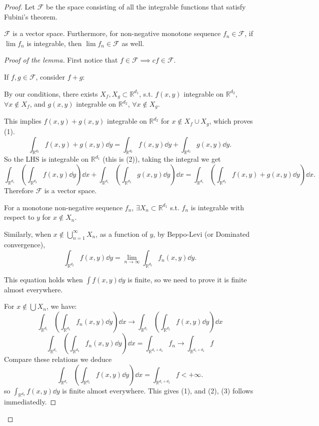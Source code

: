 \begin{proof}[Proof]
    Let $\mathscr{F}$ be the space consisting of all the integrable functions that
	satisfy Fubini's theorem.

	\begin{lemma}
		$\mathscr{F}$ is a vector space. Furthermore, for non-negative
		monotone sequence $f_n\in \mathscr{F}$, if $\lim f_n$ is integrable,
		then $\lim f_n\in \mathscr{F}$ as well.
	\end{lemma}
	\begin{proof}[Proof of the lemma]
		First notice that $f\in \mathscr{F}\implies cf\in \mathscr{F}$.

		If $f,g\in \mathscr{F}$, consider $f+g$:

		By our conditions, there exists $X_f,X_g \subset \mathbb{R}^{d_1}$,
		s.t. $f(x, y)$ integrable on  $\mathbb{R}^{d_2}$, $\forall x\notin X_f$,
		and  $g(x, y)$ integrable on $\mathbb{R}^{d_2}$, $\forall x\notin X_g$.

		This implies $f(x, y)+g(x, y)$ integrable on $\mathbb{R}^{d_2}$ for
		$x\notin X_f\cup X_g$, which proves (1).
		\[
		\int_{\mathbb{R}^{d_2}}f(x,y)+g(x,y)\dd y =
		\int_{\mathbb{R}^{d_2}}f(x,y)\dd y +\int_{\mathbb{R}^{d_2}}g(x,y)\dd y.
		\]
		So the LHS is integrable on $\mathbb{R}^{d_1}$ (this is (2)),
		taking the integral we get
		\[
		\int_{\mathbb{R}^{d_1}}\left( \int_{\mathbb{R}^{d_2}}f(x,y)\dd y \right)\dd x
		+\int_{\mathbb{R}^{d_1}}\left( \int_{\mathbb{R}^{d_2}}g(x,y)\dd y \right)\dd x
		=\int_{\mathbb{R}^{d_1}}
		\left( \int_{\mathbb{R}^{d_2}}f(x,y)+g(x,y)\dd y \right)\dd x.
		\]
		Therefore $\mathscr{F}$ is a vector space.

		For a monotone non-negative sequence $f_n$,
		$\exists X_n \subset \mathbb{R}^{d_1}$ s.t.
		$f_n$ is integrable with respect to  $y$ for $x\notin X_n$.

		Similarly, when $x\notin \bigcup_{n=1}^\infty X_n$,
		as a function of $y$, by Beppo-Levi (or Dominated convergence),
		\[
		\int_{\mathbb{R}^{d_2}}f(x,y)\dd y =
		\lim_{n\to \infty}\int_{\mathbb{R}^{d_2}}f_n(x, y)\dd y.
		\]

		This equation holds when $\int f(x,y)\dd y$ is finite,
		so we need to prove it is finite almost everywhere.

		For  $x\notin\bigcup X_n$, we have:
		\[
		\int_{\mathbb{R}^{d_1}}\left( \int_{\mathbb{R}^{d_2}}f_n(x,y)\dd y \right)\dd x
		\to\int_{\mathbb{R}^{d_1}}\left( \int_{\mathbb{R}^{d_2}}f(x,y)\dd y \right)\dd x
		\]
		\[
		\int_{\mathbb{R}^{d_1}}\left( \int_{\mathbb{R}^{d_2}}f_n(x,y)\dd y \right)\dd x
		= \int_{\mathbb{R}^{d_1+d_2}}f_n
		\to\int_{\mathbb{R}^{d_1+d_2}}f
		\]
		Compare these relations we deduce
		\[
		\int_{\mathbb{R}^{d_1}}\left( \int_{\mathbb{R}^{d_2}}f(x,y)\dd y \right)\dd x
		= \int_{\mathbb{R}^{d_1+d_2}}f < +\infty.
		\]
		so $\int_{\mathbb{R}^{d_2}}f(x,y)\dd y$ is finite almost everywhere.
		This gives (1), and (2), (3) follows immediatedly.
	\end{proof}


\end{proof}
